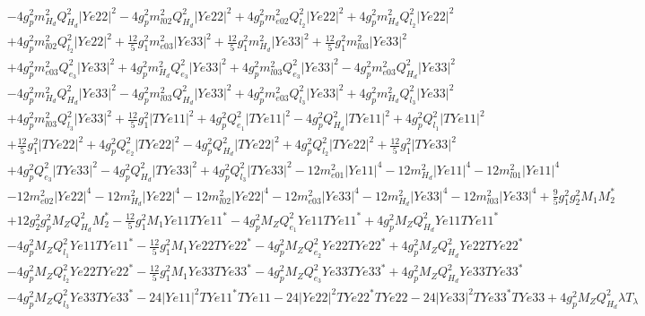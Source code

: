 \begin{align}
 &-4 g_{p}^{2} m_{H_d}^2 Q_{H_d}^{2} |Ye22|^2 -4 g_{p}^{2} m^2_{l02} Q_{H_d}^{2} |Ye22|^2 +4 g_{p}^{2} m^2_{e02} Q_{l_2}^{2} |Ye22|^2 +4 g_{p}^{2} m_{H_d}^2 Q_{l_2}^{2} |Ye22|^2 \nonumber \\ 
 &+4 g_{p}^{2} m^2_{l02} Q_{l_2}^{2} |Ye22|^2 +\frac{12}{5} g_{1}^{2} m^2_{e03} |Ye33|^2 +\frac{12}{5} g_{1}^{2} m_{H_d}^2 |Ye33|^2 +\frac{12}{5} g_{1}^{2} m^2_{l03} |Ye33|^2 \nonumber \\ 
 &+4 g_{p}^{2} m^2_{e03} Q_{e_3}^{2} |Ye33|^2 +4 g_{p}^{2} m_{H_d}^2 Q_{e_3}^{2} |Ye33|^2 +4 g_{p}^{2} m^2_{l03} Q_{e_3}^{2} |Ye33|^2 -4 g_{p}^{2} m^2_{e03} Q_{H_d}^{2} |Ye33|^2 \nonumber \\ 
 &-4 g_{p}^{2} m_{H_d}^2 Q_{H_d}^{2} |Ye33|^2 -4 g_{p}^{2} m^2_{l03} Q_{H_d}^{2} |Ye33|^2 +4 g_{p}^{2} m^2_{e03} Q_{l_3}^{2} |Ye33|^2 +4 g_{p}^{2} m_{H_d}^2 Q_{l_3}^{2} |Ye33|^2 \nonumber \\ 
 &+4 g_{p}^{2} m^2_{l03} Q_{l_3}^{2} |Ye33|^2 +\frac{12}{5} g_{1}^{2} |TYe11|^2 +4 g_{p}^{2} Q_{e_{1}}^{2} |TYe11|^2 -4 g_{p}^{2} Q_{H_d}^{2} |TYe11|^2 +4 g_{p}^{2} Q_{l_1}^{2} |TYe11|^2 \nonumber \\ 
 &+\frac{12}{5} g_{1}^{2} |TYe22|^2 +4 g_{p}^{2} Q_{e_{2}}^{2} |TYe22|^2 -4 g_{p}^{2} Q_{H_d}^{2} |TYe22|^2 +4 g_{p}^{2} Q_{l_2}^{2} |TYe22|^2 +\frac{12}{5} g_{1}^{2} |TYe33|^2 \nonumber \\ 
 &+4 g_{p}^{2} Q_{e_3}^{2} |TYe33|^2 -4 g_{p}^{2} Q_{H_d}^{2} |TYe33|^2 +4 g_{p}^{2} Q_{l_3}^{2} |TYe33|^2 -12 m^2_{e01} |Ye11|^4 -12 m_{H_d}^2 |Ye11|^4 -12 m^2_{l01} |Ye11|^4 \nonumber \\ 
 &-12 m^2_{e02} |Ye22|^4 -12 m_{H_d}^2 |Ye22|^4 -12 m^2_{l02} |Ye22|^4 -12 m^2_{e03} |Ye33|^4 -12 m_{H_d}^2 |Ye33|^4 -12 m^2_{l03} |Ye33|^4 +\frac{9}{5} g_{1}^{2} g_{2}^{2} M_1 M_2^* \nonumber \\ 
 &+12 g_{2}^{2} g_{p}^{2} M_Z Q_{H_d}^{2} M_2^* -\frac{12}{5} g_{1}^{2} M_1 Ye11 TYe11^* -4 g_{p}^{2} M_Z Q_{e_{1}}^{2} Ye11 TYe11^* +4 g_{p}^{2} M_Z Q_{H_d}^{2} Ye11 TYe11^* \nonumber \\ 
 &-4 g_{p}^{2} M_Z Q_{l_1}^{2} Ye11 TYe11^* -\frac{12}{5} g_{1}^{2} M_1 Ye22 TYe22^* -4 g_{p}^{2} M_Z Q_{e_{2}}^{2} Ye22 TYe22^* +4 g_{p}^{2} M_Z Q_{H_d}^{2} Ye22 TYe22^* \nonumber \\ 
 &-4 g_{p}^{2} M_Z Q_{l_2}^{2} Ye22 TYe22^* -\frac{12}{5} g_{1}^{2} M_1 Ye33 TYe33^* -4 g_{p}^{2} M_Z Q_{e_3}^{2} Ye33 TYe33^* +4 g_{p}^{2} M_Z Q_{H_d}^{2} Ye33 TYe33^* \nonumber \\ 
 &-4 g_{p}^{2} M_Z Q_{l_3}^{2} Ye33 TYe33^* -24 |Ye11|^2 TYe11^* TYe11 -24 |Ye22|^2 TYe22^* TYe22 -24 |Ye33|^2 TYe33^* TYe33 +4 g_{p}^{2} M_Z Q_{H_d}^{2} \lambda T_{\lambda} \nonumber \\ 

\end{align}
